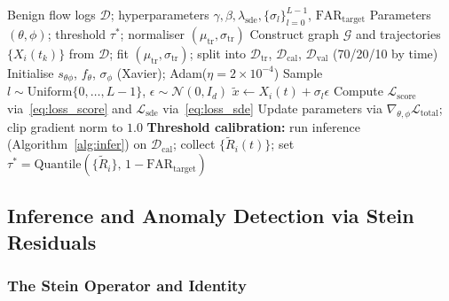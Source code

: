 \begin{algorithm}[t]
\caption{\textsc{Siren} Training}
\label{alg:train}
\begin{algorithmic}[1]
\Require Benign flow logs $\mathcal{D}$; hyperparameters
         $\gamma, \beta, \lambda_{\mathrm{sde}}, \{\sigma_l\}_{l=0}^{L-1}$,
         $\mathrm{FAR}_{\mathrm{target}}$
\Ensure Parameters $(\theta, \phi)$; threshold $\tau^*$; normaliser $(\mu_\mathrm{tr}, \sigma_\mathrm{tr})$
\State Construct graph $\mathcal{G}$ and trajectories
       $\{X_i(t_k)\}$ from $\mathcal{D}$; fit $(\mu_\mathrm{tr}, \sigma_\mathrm{tr})$;
       split into $\mathcal{D}_\mathrm{tr}$, $\mathcal{D}_\mathrm{cal}$,
       $\mathcal{D}_\mathrm{val}$ (70/20/10 by time)
\State Initialise $s_{\theta\phi}$, $f_\theta$, $\sigma_\phi$ (Xavier);
       Adam($\eta=2\times 10^{-4}$)
  \State Sample $l \sim \mathrm{Uniform}\{0,\ldots,L-1\}$,
         $\epsilon \sim \mathcal{N}(0, I_d)$
  \State $\tilde{x} \leftarrow X_i(t) + \sigma_l \epsilon$
  \State Compute $\mathcal{L}_{\mathrm{score}}$ via~\eqref{eq:loss_score}
         and $\mathcal{L}_{\mathrm{sde}}$ via~\eqref{eq:loss_sde}
  \State Update parameters via $\nabla_{\theta,\phi}\mathcal{L}_{\mathrm{total}}$;
         clip gradient norm to $1.0$
\EndFor
\State \textbf{Threshold calibration:} run inference
       (Algorithm~\ref{alg:infer}) on $\mathcal{D}_\mathrm{cal}$;
       collect $\{\tilde{R}_i(t)\}$;
       set $\tau^* = \mathrm{Quantile}\!\left(\{\tilde{R}_i\},\,
       1 - \mathrm{FAR}_{\mathrm{target}}\right)$
\end{algorithmic}
\end{algorithm}

\subsection{Inference and Anomaly Detection via Stein Residuals}
\label{sec:inference}

\subsubsection{The Stein Operator and Identity}

